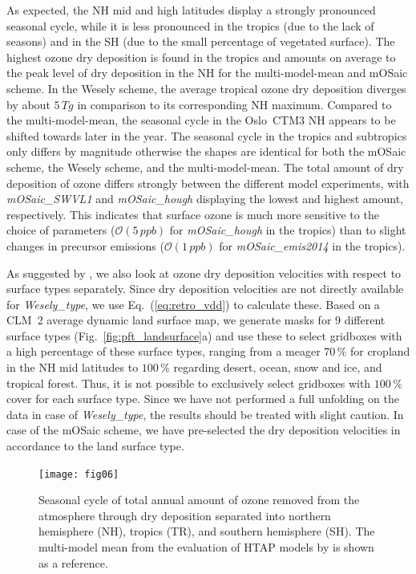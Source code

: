 \documentclass[gmd, manuscript]{copernicus}
\begin{document}
As expected, the NH mid and high latitudes display a strongly pronounced seasonal cycle, while it is less pronounced in the tropics (due to the lack of seasons) and in the SH (due to the small percentage of vegetated surface). The highest ozone dry deposition is found in the tropics and amounts on average to the  peak level of dry deposition in the NH for the multi-model-mean \citep{ACP:Hardacre2015} and mOSaic scheme. In the Wesely scheme, the average tropical ozone dry deposition diverges by about $5\,\unit{Tg}$ in comparison to its corresponding NH maximum. Compared to the multi-model-mean, the seasonal cycle in the Oslo~CTM3 NH appears to be shifted towards later in the year. The seasonal cycle in the tropics and subtropics only differs by magnitude otherwise the shapes are identical for both the mOSaic scheme, the Wesely scheme, and the multi-model-mean. The total amount of dry deposition of ozone differs strongly between the different model experiments, with \emph{mOSaic\_SWVL1} and \emph{mOSaic\_hough} displaying the lowest and highest amount, respectively. This indicates that surface ozone is much more sensitive to the choice of parameters ($\mathcal{O}(5\,\unit{ppb})$ for \emph{mOSaic\_hough} in the tropics) than to slight changes in precursor emissions ($\mathcal{O}(1\,\unit{ppb})$ for \emph{mOSaic\_emis2014} in the tropics).

As suggested by \citet{ACP:Hardacre2015}, we also look at ozone dry deposition velocities with respect to surface types separately. Since dry deposition velocities are not directly available for \emph{Wesely\_type}, we use Eq.~(\ref{eq:retro_vdd}) to calculate these. Based on a CLM~2 average dynamic land surface map, we generate masks for 9 different surface types (Fig.~\ref{fig:pft_landsurface}a) and use these to select gridboxes with a high percentage of these surface types, ranging from a meager $70\,\unit{\%}$ for cropland in the NH mid latitudes to $100\,\unit{\%}$ regarding desert, ocean, snow and ice, and tropical forest. Thus, it is not possible to exclusively select gridboxes with $100\,\unit{\%}$ cover for each surface type. Since we have not performed a full unfolding on the data in case of \emph{Wesely\_type}, the results should be treated with slight caution. In case of the mOSaic scheme, we have pre-selected the dry deposition velocities in accordance to the land surface type.
%
\begin{figure}[t]
  \texttt{[image: fig06]}
  \caption{Seasonal cycle of total annual amount of ozone removed from the atmosphere through dry deposition separated into northern hemisphere (NH), tropics (TR), and southern hemisphere (SH). The multi-model mean from the evaluation of HTAP models by \citet{ACP:Hardacre2015} is shown as a reference.}
  \label{fig:mmm_drydep_hem}
\end{figure}
%
\end{document}
